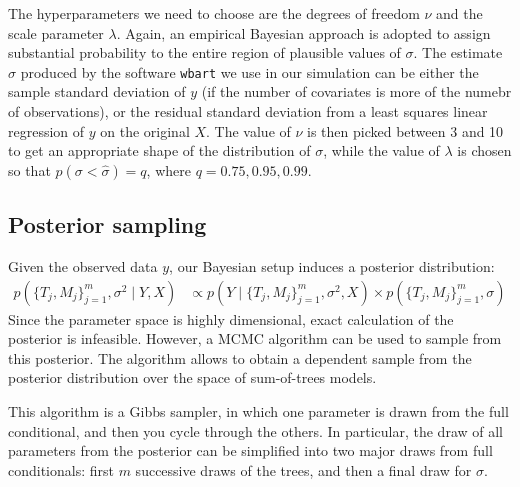 \documentclass[a4paper,11pt]{article}
\begin{document}
The hyperparameters we need to choose are the degrees of freedom $\nu$ and the scale parameter $\lambda$. Again, an empirical Bayesian approach is adopted to assign 
substantial probability to the entire region of plausible values of $\sigma$. The estimate $\hat{\sigma}$ produced by the software \texttt{wbart} we use in our simulation can be either the sample standard deviation of \( y \) (if the number of covariates is more of the numebr of observations), or the residual standard deviation from a least squares linear regression of \( y \) on the original \( X \). 
The value of \( \nu \) is then picked between 3 and 10 to get an appropriate shape of the distribution of $\sigma$, while the value of \( \lambda \) is chosen so that \( p(\sigma < \hat{\sigma}) = q \), where $q = 0.75, 0.95, 0.99$.

\subsection{ Posterior sampling}
Given the observed data \( y \), our Bayesian setup induces a posterior distribution:
\[
\begin{aligned}
p\left( \{T_j, M_j\}_{j=1}^m, \sigma^2 \mid Y, X \right) &\propto p\left( Y \mid \{T_j, M_j\}_{j=1}^m, \sigma^2, X \right) \times p\left( \{T_j, M_j\}_{j=1}^m, \sigma \right)
\end{aligned}
\]
Since the parameter space is highly dimensional, exact calculation of the posterior is infeasible. However, a MCMC algorithm can be used to sample from this posterior. The algorithm allows to obtain a dependent sample from the posterior
 distribution over the space of sum-of-trees models. 

This algorithm is a Gibbs sampler, in which one parameter is drawn from the full conditional, and then you cycle through the others. In particular, the draw of all parameters from the posterior can be simplified into two major draws from full conditionals: first $m$ successive draws of the trees, and then a final draw for $\sigma$.
\end{document}
